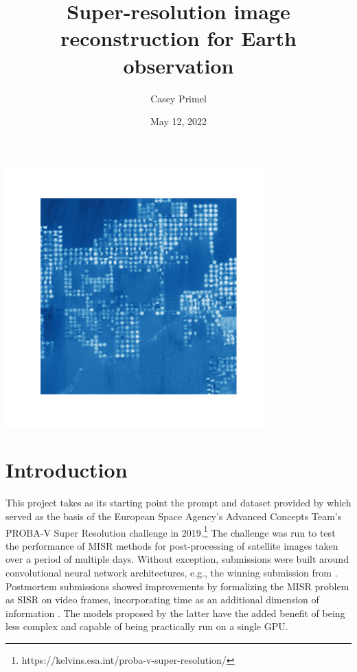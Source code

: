 \documentclass{article}
\title{Super-resolution image reconstruction for Earth observation}
\date{May 12, 2022}
\author{Casey Primel}
\begin{document}
\maketitle

\begin{center}
    \includegraphics[width=0.75\textwidth]{superres2.png}
\end{center}



\section{Introduction}

This project takes as its starting point the prompt and dataset provided by \citet{Martens2021} which served as the basis of the European Space Agency's Advanced Concepts Team's PROBA-V Super Resolution challenge in 2019.\footnote{https://kelvins.esa.int/proba-v-super-resolution/} The challenge was run to test the performance of MISR methods for post-processing of satellite images taken over a period of multiple days. Without exception, submissions were built around convolutional neural network architectures, e.g., the winning submission from \citet{Molini2020}. Postmortem submissions showed improvements by formalizing the MISR problem as SISR on video frames, incorporating time as an additional dimension of information \citep*{mark_bajo_2020_3733116,Dorr2020}. The models proposed by the latter have the added benefit of being less complex and capable of being practically run on a single GPU.
\end{document}
